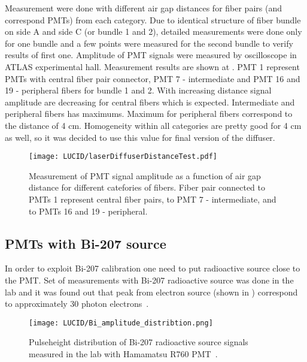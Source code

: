 Measurement were done with different air gap distances for fiber pairs (and correspond PMTs) from each category. 
Due to identical structure of fiber bundle on side A and side C (or bundle 1 and 2), detailed measurements
were done only for one bundle and a few points were measured for the second bundle to verify results of first one. Amplitude of PMT signals were measured by 
oscilloscope in ATLAS experimental hall. Measurement results are shown at . PMT 1 represent PMTs with central fiber 
pair connector, PMT 7 - intermediate and PMT 16 and 19 - peripheral fibers for bundle 1 and 2. 
With increasing distance signal amplitude are decreasing for central fibers which is expected. 
Intermediate and peripheral fibers has maximums. Maximum for peripheral fibers correspond to the distance of 4 cm.
Homogeneity within all categories are pretty good for 4 cm as well, so it was decided to use this value for final version of the diffuser.



\begin{figure}
\centering
\texttt{[image: LUCID/laserDiffuserDistanceTest.pdf]}
\caption{Measurement of PMT signal amplitude as a function of air gap distance for different catefories of fibers. Fiber pair connected to PMTs 1 represent 
central fiber pairs, to PMT 7 - intermediate, and to PMTs 16 and 19 - peripheral.}
\label{fig:laserDiffuserDistanceTest}
\end{figure}


\subsection{PMTs with Bi-207 source}
\label{subsec:bi207Calibration}

In order to exploit Bi-207 calibration one need to put radioactive source close to the PMT.
Set of measurements with Bi-207 radioactive source was done in the lab and it was found out that peak from electron source 
(shown in ) correspond to approximately 30 photon electrons~\cite{Alberghi:2016tad}.

\begin{figure}
\centering
\texttt{[image: LUCID/Bi\_amplitude\_distribtion.png]}
\caption{Pulseheight distribution of Bi-207 radioactive source signals measured in the lab with Hamamatsu R760 PMT~\cite{Alberghi:2016tad}.}
\label{fig:pulseheight_Bi207}
\end{figure}


